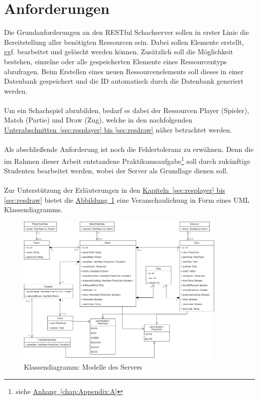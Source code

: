 \section{Anforderungen}\label{sec:anforderungen}
Die Grundanforderungen an den RESTful Schachserver sollen in erster Linie die Bereitstellung aller benötigten Ressourcen sein. Dabei sollen Elemente erstellt, ggf. bearbeitet und gelöscht werden können. Zusätzlich soll die Möglichkeit bestehen, einzelne oder alle gespeicherten Elemente eines Ressourcentyps abzufragen. Beim Erstellen eines neuen Ressourcenelements soll dieses in einer Datenbank gespeichert und die ID automatisch durch die Datenbank generiert werden.\\
\\
Um ein Schachspiel abzubilden, bedarf es dabei der Ressourcen Player (Spieler), Match (Partie) und Draw (Zug), welche in den nachfolgenden \hyperref[sec:resplayer, sec:resdraw]{Unterabschnitten~\ref{sec:resplayer} bis \ref{sec:resdraw}} näher betrachtet werden.\\
\\
Als abschließende Anforderung ist noch die Fehlertoleranz zu erwähnen. Denn die im Rahmen dieser Arbeit entstandene Praktikumsaufgabe\footnote{siehe \hyperref[chap:Appendix:A]{Anhang~\ref{chap:Appendix:A}}} soll durch zukünftige Studenten bearbeitet werden, wobei der Server als Grundlage dienen soll.\\
\\
Zur Unterstützung der Erläuterungen in den \hyperref[sec:resplayer, sec:resdraw]{Kapiteln~\ref{sec:resplayer} bis \ref{sec:resdraw}} bietet die \hyperref[fig:classdiagram]{Abbildung~\ref{fig:classdiagram}} eine Veranschaulichung in Form eines \gls{UML} Klassendiagramms.
\begin{figure}
	\includegraphics[width=0.9\textwidth]{images/classdiagram.png}
	\caption{Klassendiagramm: Modelle des Servers}
	\label{fig:classdiagram}
\end{figure}

